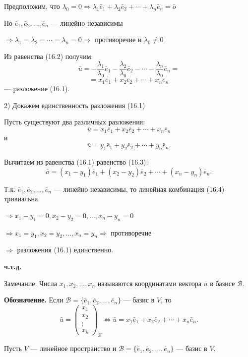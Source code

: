 \documentclass[12pt,a4paper]{article}
\newcommand{\vu}{\bar u}
\newcommand{\ve}{\bar e}
\newcommand{\vo}{\bar o}
\begin{document}
Предположим, что $\lambda_0 = 0 \Rightarrow \lambda_1 \ve_1 +
\lambda_2 \ve_2 + \cdots + \lambda_n \ve_n = \vo$

Но $\ve_1, \ve_2, \ldots, \ve_n$ --- линейно независимы

$\Rightarrow \lambda_1 = \lambda_2 = \cdots = \lambda_n = 0
\Rightarrow$ противоречие и $\lambda_0 \ne 0$

Из равенства (16.2) получим:
$$
\vu = -\frac{\lambda_1}{\lambda_0} \ve_1 -
\frac{\lambda_2}{\lambda_0} \ve_2 - \cdots - \frac{\lambda_n}{\lambda_0} \ve_n =
$$
$$
= x_1 \ve_1 + x_2 \ve_2 + \cdots + x_n \ve_n
$$
--- разложение (16.1).

2) Докажем единственность разложения (16.1)

Пусть существуют два различных разложения:
$$
\vu = x_1 \ve_1 + x_2 \ve_2 + \cdots + x_n \ve_n
$$
и
\begin{equation}
\vu = y_1 \ve_1 + y_2 \ve_2 + \cdots + y_n \ve_n. \tag{16.3}
\end{equation}

Вычитаем из равенства (16.1) равенство (16.3):
\begin{equation}
\vo = (x_1 - y_1) \ve_1 + (x_2 - y_2) \ve_2 + \cdots + (x_n - y_n)
\ve_n. \tag{16.4}
\end{equation}

Т.к. $\ve_1, \ve_2, \ldots, \ve_n$ --- линейно независимы, то
линейная комбинация (16.4) тривиальна

$\Rightarrow x_1 - y_1 = 0, x_2 - y_2 = 0, \ldots, x_n - y_n = 0$

$\Rightarrow x_1 = y_1, x_2 = y_2, \ldots, x_n = y_n \Rightarrow$ противоречие

$\Rightarrow$ разложения (16.1) единственно.

\textbf{ч.т.д.}

Замечание. Числа $x_1, x_2, \ldots, x_n$ называются координатами
вектора $\vu$ в базисе $\mathcal{B}$.

\textbf{Обозначение.} Если $\mathcal{B} = \{\ve_1, \ve_2, \ldots,
\ve_n\}$ --- базис в $V$, то
$$
\vu =
\begin{pmatrix} x_1 \\ x_2 \\ \vdots \\ x_n
\end{pmatrix}_{\mathcal{B}} \Leftrightarrow \vu = x_1 \ve_1 + x_2
\ve_2 + \cdots + x_n \ve_n.
$$

Пусть $V$ --- линейное пространство и $\mathcal{B} = \{\ve_1, \ve_2,
\ldots, \ve_n\}$ --- базис в $V$.
\end{document}
